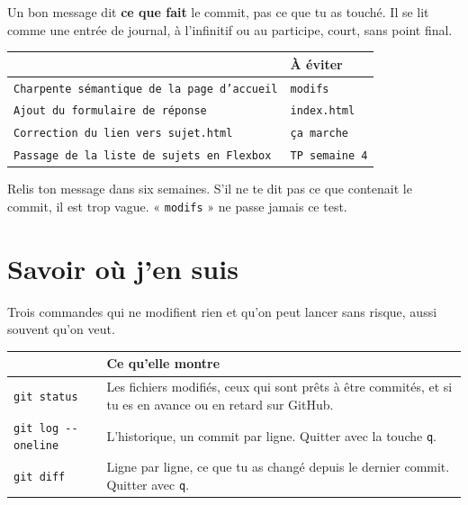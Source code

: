 \documentclass[a4paper,11pt]{article}
\newcommand{\hdr}[1]{\multicolumn{1}{l}{\color{white}\bfseries #1}}
\renewcommand{\arraystretch}{1.3}
\begin{document}
Un bon message dit \textbf{ce que fait} le commit, pas ce que tu as touché. Il se lit comme une entrée de journal, à l'infinitif ou au participe, court, sans point final.

\begin{center}
\renewcommand{\arraystretch}{1.1}
\begin{tabularx}{\linewidth}{XX}
  \toprule
  \rowcolor{uniNavy}
  \hdr{À écrire} & \hdr{À éviter} \\
  \midrule
  \rowcolor{uniPaper}
  \texttt{Charpente sémantique de la page d'accueil} & \texttt{modifs} \\
  \texttt{Ajout du formulaire de réponse} & \texttt{index.html} \\
  \rowcolor{uniPaper}
  \texttt{Correction du lien vers sujet.html} & \texttt{ça marche} \\
  \texttt{Passage de la liste de sujets en Flexbox} & \texttt{TP semaine 4} \\
  \bottomrule
\end{tabularx}
\end{center}

\begin{tcolorbox}[astuce, title={Test rapide}]
Relis ton message dans six semaines. S'il ne te dit pas ce que contenait le commit, il est trop vague. « \texttt{modifs} » ne passe jamais ce test.
\end{tcolorbox}

\section{Savoir où j'en suis}

Trois commandes qui ne modifient rien et qu'on peut lancer sans risque, aussi souvent qu'on veut.

\begin{center}
\renewcommand{\arraystretch}{1.1}
\begin{tabularx}{\linewidth}{p{4.4cm}X}
  \toprule
  \rowcolor{uniNavy}
  \hdr{Commande} & \hdr{Ce qu'elle montre} \\
  \midrule
  \rowcolor{uniPaper}
  \texttt{git status} & Les fichiers modifiés, ceux qui sont prêts à être commités, et si tu es en avance ou en retard sur GitHub. \\
  \texttt{git log -{}-oneline} & L'historique, un commit par ligne. Quitter avec la touche \texttt{q}. \\
  \rowcolor{uniPaper}
  \texttt{git diff} & Ligne par ligne, ce que tu as changé depuis le dernier commit. Quitter avec \texttt{q}. \\
  \bottomrule
\end{tabularx}
\end{center}
\end{document}
